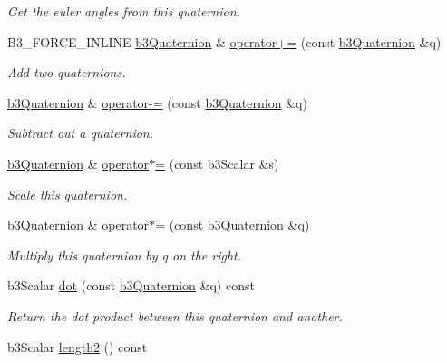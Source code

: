 \begin{CompactItemize}
\begin{CompactList}\small\item\em Get the euler angles from this quaternion. \item\end{CompactList}\item 
B3\_\-FORCE\_\-INLINE \hyperlink{classb3_quaternion}{b3Quaternion} \& \hyperlink{classb3_quaternion_558450afdbe170892934fa936d085b1b}{operator+=} (const \hyperlink{classb3_quaternion}{b3Quaternion} \&q)
\begin{CompactList}\small\item\em Add two quaternions. \item\end{CompactList}\item 
\hyperlink{classb3_quaternion}{b3Quaternion} \& \hyperlink{classb3_quaternion_76087565cf44b29f38d8d2b5ac3cc268}{operator-=} (const \hyperlink{classb3_quaternion}{b3Quaternion} \&q)
\begin{CompactList}\small\item\em Subtract out a quaternion. \item\end{CompactList}\item 
\hyperlink{classb3_quaternion}{b3Quaternion} \& \hyperlink{classb3_quaternion_b21bc07cb139b5f1f604432666a28deb}{operator$\ast$=} (const b3Scalar \&s)
\begin{CompactList}\small\item\em Scale this quaternion. \item\end{CompactList}\item 
\hyperlink{classb3_quaternion}{b3Quaternion} \& \hyperlink{classb3_quaternion_756f3ae0fbbdf018fb3d63b95f4ddcaa}{operator$\ast$=} (const \hyperlink{classb3_quaternion}{b3Quaternion} \&q)
\begin{CompactList}\small\item\em Multiply this quaternion by q on the right. \item\end{CompactList}\item 
b3Scalar \hyperlink{classb3_quaternion_747537c86fc2d63a6fc43db811952634}{dot} (const \hyperlink{classb3_quaternion}{b3Quaternion} \&q) const 
\begin{CompactList}\small\item\em Return the dot product between this quaternion and another. \item\end{CompactList}\item 
\hypertarget{classb3_quaternion_a8d3d563ea89e36794d63bd289934509}{
b3Scalar \hyperlink{classb3_quaternion_a8d3d563ea89e36794d63bd289934509}{length2} () const }
\label{classb3_quaternion_a8d3d563ea89e36794d63bd289934509}


\end{CompactItemize}
